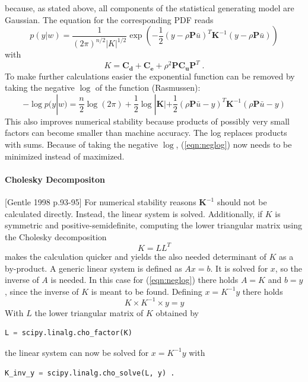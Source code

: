 \documentclass[%
  a4paper,oneside,%
  11pt,%
  smallchapters,
  green,%
  rgb, <cmyk>
  ,]{tubsbook}
\begin{document}
because, as stated above, all components of the statistical generating model are Gaussian.
The equation for the corresponding PDF reads
\begin{equation}
p(y|w) = \frac{1}{(2 \pi)^{n/2} |K|^{1/2} } \exp \left(   -\frac{1}{2} (y - \rho \bm{P}\bar{u})^T \bm{K}^{-1} (y - \rho \bm{P}\bar{u})   \right)
\end{equation}
with
\begin{equation}
K = \bm{C_d}+\bm{C_e} + \rho^2 \bm{P} \bm{C_u} \bm{P}^T \; .
\end{equation}
%
To make further calculations easier the exponential function can be removed by taking the negative $\log$ of the function (Rasmussen):
\begin{equation}
- \log p(y|w) = \frac{n}{2} \log(2 \pi) + \frac{1}{2} \log |\bm{K}| + \frac{1}{2}(\rho \bm{P}\bar{u} - y)^T \bm{K}^{-1} (\rho \bm{P}\bar{u} - y) 
\label{eqn:neglog}
\end{equation}
This also improves numerical stability because products of possibly very small factors can become smaller than machine accuracy. The log replaces products with sums.
Because of taking the negative $\log$, (\ref{eqn:neglog}) now needs to be minimized instead of maximized. 

\paragraph{Cholesky Decompositon}
[Gentle 1998 p.93-95]
For numerical stability reasons $\bm{K}^{-1}$ should not be calculated directly. Instead, the linear system is solved. Additionally, if $K$ is symmetric and positive-semidefinite, computing the lower triangular matrix using the Cholesky decomposition 
\begin{equation}
K = LL^T
\end{equation}
makes the calculation quicker and yields the also needed determinant of $K$ as a by-product. 
A generic linear system is defined as $A x = b$. It is solved for $x$, so the inverse of $A$ is needed. In this case for (\ref{eqn:neglog}) there holds $A=K$ and $b = y$, since the inverse of $K$ is meant to be found. Defining $x = K^{-1}y$ there holds
\begin{equation}
K \times K^{-1} \times y = y
\end{equation}
%
With $L$ the lower triangular matrix of $K$ obtained by 
\begin{lstlisting}[language=Python]
L = scipy.linalg.cho_factor(K)
\end{lstlisting}
the linear system can now be solved for $x = K^{-1}y$ with
\begin{lstlisting}[language=Python]
K_inv_y = scipy.linalg.cho_solve(L, y) .
\end{lstlisting}
\end{document}
